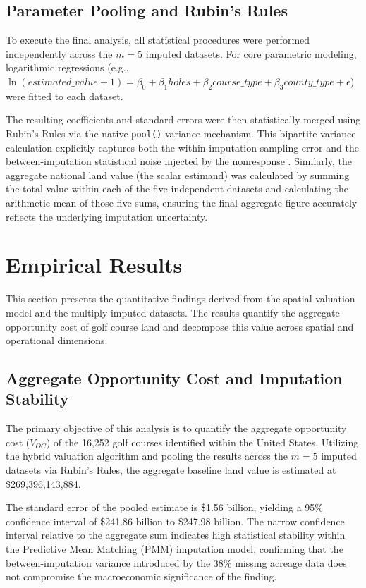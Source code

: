 \documentclass[10pt, letterpaper]{article}
\begin{document}
\subsection{Parameter Pooling and Rubin's Rules}
To execute the final analysis, all statistical procedures were performed independently across the $m=5$ imputed datasets. For core parametric modeling, logarithmic regressions (e.g., $\ln(estimated\_value + 1) = \beta_0 + \beta_1 holes + \beta_2 course\_type + \beta_3 county\_type + \epsilon$) were fitted to each dataset. 

The resulting coefficients and standard errors were then statistically merged using Rubin's Rules via the native \texttt{pool()} variance mechanism. This bipartite variance calculation explicitly captures both the within-imputation sampling error and the between-imputation statistical noise injected by the nonresponse \parencite{Burren2018}. Similarly, the aggregate national land value (the scalar estimand) was calculated by summing the total value within each of the five independent datasets and calculating the arithmetic mean of those five sums, ensuring the final aggregate figure accurately reflects the underlying imputation uncertainty.

\newpage

\section{Empirical Results}

This section presents the quantitative findings derived from the spatial valuation model and the multiply imputed datasets. The results quantify the aggregate opportunity cost of golf course land and decompose this value across spatial and operational dimensions.

\subsection{Aggregate Opportunity Cost and Imputation Stability}
The primary objective of this analysis is to quantify the aggregate opportunity cost ($V_{OC}$) of the 16,252 golf courses identified within the United States. Utilizing the hybrid valuation algorithm and pooling the results across the $m=5$ imputed datasets via Rubin's Rules, the aggregate baseline land value is estimated at \$269,396,143,884. 

The standard error of the pooled estimate is \$1.56 billion, yielding a 95\% confidence interval of \$241.86 billion to \$247.98 billion. The narrow confidence interval relative to the aggregate sum indicates high statistical stability within the Predictive Mean Matching (PMM) imputation model, confirming that the between-imputation variance introduced by the 38\% missing acreage data does not compromise the macroeconomic significance of the finding. 
\end{document}
